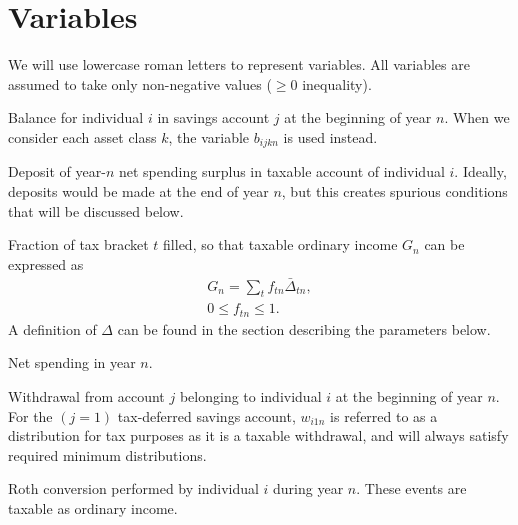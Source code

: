 \documentclass{report}[fleqn,12pt]
\begin{document}
\section{Variables}
We will use lowercase roman letters to represent variables. All variables are assumed
to take only non-negative values ($\ge 0$ inequality).
\begin{description}[leftmargin=4em,style=multiline]
\item [$b_{ijn}$]
	Balance for individual $i$ in savings account $j$ at the beginning of year $n$.
	When we consider each asset class $k$, the variable $b_{ijkn}$ is used instead.
\item [$d_{in}$]
	Deposit of year-$n$ net spending surplus in taxable account of individual $i$.
	Ideally, deposits would be made at the end of year $n$, but this creates spurious
	conditions that will be discussed below.
\item [$f_{t n}$]
	Fraction of tax bracket $t$ filled, so that taxable ordinary income $G_n$ can be expressed as
	\begin{eqnarray}
		\label{Eq:Tx1}
		G_n = \sum_t f_{t n}\bar{\Delta}_{t n},\\
		0 \leq f_{t n} \leq 1.
	\end{eqnarray}
	A definition of $\Delta$ can be found in the section describing the parameters below. 
\item [$g_n$]
	Net spending in year $n$.
\item [$w_{ijn}$]
	Withdrawal from account $j$ belonging to individual $i$ at the beginning of year $n$.
	For the $(j=1)$ tax-deferred savings account, $w_{i1n}$ is referred to as a distribution for
	tax purposes as it is a taxable withdrawal, and will always satisfy required minimum distributions.
\item [$x_{in}$]
	Roth conversion performed by individual $i$ during year $n$.
	These events are taxable as ordinary income.
\end{description}
\end{document}
